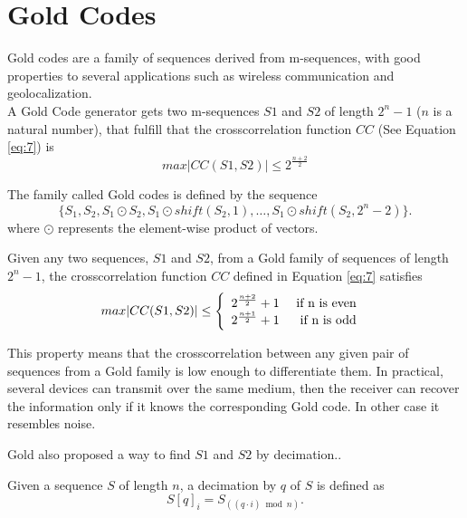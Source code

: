 \section{Gold Codes}

Gold codes\cite{gold_codes} are a family of sequences derived from
m-sequences, with good properties to several
applications such as wireless communication and geolocalization.\\

A Gold Code generator gets two m-sequences $S1$ and $S2$  of length
 $2^{n}-1$ ($n$ is a natural number), that fulfill that the crosscorrelation function $CC$ (See Equation \eqref{eq:7}) is
  \begin{equation}\label{gold:eq:1}
      max |CC(S1, S2)| \leq 2^{\frac{n+2}{2}}
    \end{equation}

The family called Gold codes is defined by the sequence
$$
\{S_1, S_2, S_1\odot S_2, S_1\odot shift(S_2, 1), \ldots, S_1\odot shift(S_2,2^n-2)\}.
$$
where $\odot$ represents the element-wise product of vectors.


\begin{property}
  Given any two sequences, $S1$ and $S2$, from a Gold family of sequences of length
  $2^{n}-1$,  the crosscorrelation function $CC$ defined in Equation \eqref{eq:7} satisfies
  \begin{equation}
        max |CC(S1, S2)| \leq \left\{\begin{array}{lr}
            2^{\frac{n+2}{2}}+1 & \textnormal{ if n is even } \\
            2^{\frac{n+1}{2}}+1 & \textnormal{ if n is odd } \\
        \end{array}\right.
  \end{equation}
\end{property}

This property means that the crosscorrelation between any given pair of
sequences from a Gold family is low enough to differentiate them.
 In practical, several devices can transmit over the same medium, then the receiver can recover the information only if it knows the corresponding Gold code. In other case it  resembles noise.

Gold also proposed  a way to find $S1$ and $S2$ by decimation..

\begin{definition}[Decimation]
  Given a sequence $S$ of length $n$, a decimation by $q$ of $S$ is defined as
  \begin{equation}
    S[q]_{i} = S_{((q·i) \bmod n)}.
  \end{equation}
\end{definition}

